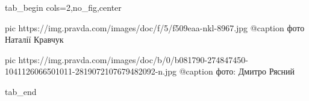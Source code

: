  
 
 
 
 


\ifcmt
  tab_begin cols=2,no_fig,center

     pic https://img.pravda.com/images/doc/f/5/f509eaa-nkl-8967.jpg
		 @caption фото Наталії Кравчук

		 pic https://img.pravda.com/images/doc/b/0/b081790-274847450-1041126066501011-2819072107679482092-n.jpg
		 @caption фото: Дмитро Рясний

  tab_end
\fi
